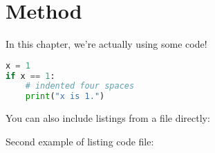 \chapter{Method}\label{ch:method}

In this chapter, we're actually using some code!

\begin{lstlisting}[language=Python,caption={This is an example of inline listing},captionpos=b]
x = 1
if x == 1:
    # indented four spaces
    print("x is 1.")

\end{lstlisting}

You can also include listings from a file directly:



Second example of listing code file:

